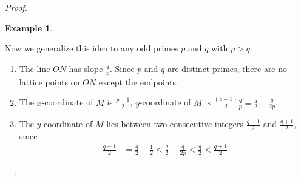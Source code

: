 \documentclass{ximera}
\newtheorem{ex}{Example}
\begin{document}
\begin{proof}
\begin{ex}
 \end{ex}
 
%
%
%
%

Now we generalize this idea to any odd primes $p$ and $q$ with $p>q$.
\begin{enumerate}[label=\alph*)]
 \item The line $ON$ has slope $\frac{q}{p} $. Since $p$ and $q$ are distinct primes, there are no lattice points on $ON$ except the endpoints. 
  \item The $x$-coordinate of $M$ is $\frac{p-1}{2} $, $y$-coordinate of $M$ is $\frac{(p-1)}{2}\frac{q}{p}=\frac{q}{2}-\frac{q}{2p}$.
 \item The $y$-coordinate of $M$ lies between two consecutive integers $\frac{q-1}{2}$ and $\frac{q+1}{2}$, since 
\begin{align*}
 \frac{q-1}{2}&=\frac{q}{2}-\frac{1}{2}<\frac{q}{2}-\frac{q}{2p}<\frac{q}{2}<\frac{q+1}{2}
\end{align*}
\end{enumerate}


\end{proof}
\end{document}

